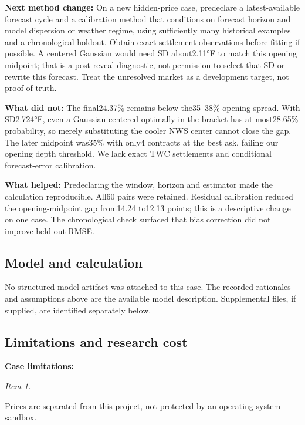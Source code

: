 \documentclass[11pt]{article}
\begin{document}
\par\noindent\textbf{Next method change:} On a new hidden-price case, predeclare a latest-available forecast cycle and a calibration method that conditions on forecast horizon and model dispersion or weather regime, using sufficiently many historical examples and a chronological holdout. Obtain exact settlement observations before fitting if possible. A centered Gaussian would need SD about2.11°F to match this opening midpoint; that is a post-reveal diagnostic, not permission to select that SD or rewrite this forecast. Treat the unresolved market as a development target, not proof of truth.

\par\noindent\textbf{What did not:} The final24.37\% remains below the35–38\% opening spread. With SD2.724°F, even a Gaussian centered optimally in the bracket has at most28.65\% probability, so merely substituting the cooler NWS center cannot close the gap. The later midpoint was35\% with only4 contracts at the best ask, failing our opening depth threshold. We lack exact TWC settlements and conditional forecast-error calibration.

\par\noindent\textbf{What helped:} Predeclaring the window, horizon and estimator made the calculation reproducible. All60 pairs were retained. Residual calibration reduced the opening-midpoint gap from14.24 to12.13 points; this is a descriptive change on one case. The chronological check surfaced that bias correction did not improve held-out RMSE.

\subsection*{\textcolor{epdarkgreen}{Model and calculation}}
No structured model artifact was attached to this case. The recorded rationales and assumptions above are the available model description. Supplemental files, if supplied, are identified separately below.


\subsection*{\textcolor{epdarkgreen}{Limitations and research cost}}
\par\noindent\textbf{Case limitations:} \par \par\noindent\textit{Item 1.}\par Prices are separated from this project, not protected by an operating-system sandbox.
\end{document}
